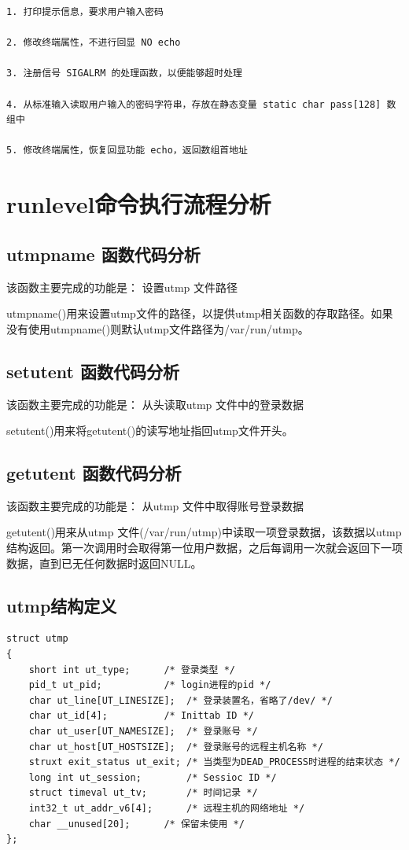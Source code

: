 {\begin{shaded}\begin{verbatim}
1. 打印提示信息，要求用户输入密码

2. 修改终端属性，不进行回显 NO echo

3. 注册信号 SIGALRM 的处理函数，以便能够超时处理

4. 从标准输入读取用户输入的密码字符串，存放在静态变量 static char pass[128] 数组中

5. 修改终端属性，恢复回显功能 echo，返回数组首地址
\end{verbatim}\end{shaded}}
\section{runlevel命令执行流程分析}

\subsection{utmpname 函数代码分析}

该函数主要完成的功能是： 设置utmp 文件路径

utmpname()用来设置utmp文件的路径，以提供utmp相关函数的存取路径。如果没有使用utmpname()则默认utmp文件路径为/var/run/utmp。

\subsection{setutent 函数代码分析}

该函数主要完成的功能是： 从头读取utmp 文件中的登录数据

setutent()用来将getutent()的读写地址指回utmp文件开头。

\subsection{getutent 函数代码分析}

该函数主要完成的功能是： 从utmp 文件中取得账号登录数据

getutent()用来从utmp 文件(/var/run/utmp)中读取一项登录数据，该数据以utmp
结构返回。第一次调用时会取得第一位用户数据，之后每调用一次就会返回下一项数据，直到已无任何数据时返回NULL。

\subsection{utmp结构定义}

{\begin{shaded}\begin{verbatim}
struct utmp
{
    short int ut_type;      /* 登录类型 */
    pid_t ut_pid;           /* login进程的pid */
    char ut_line[UT_LINESIZE];  /* 登录装置名，省略了/dev/ */
    char ut_id[4];          /* Inittab ID */
    char ut_user[UT_NAMESIZE];  /* 登录账号 */
    char ut_host[UT_HOSTSIZE];  /* 登录账号的远程主机名称 */
    struxt exit_status ut_exit; /* 当类型为DEAD_PROCESS时进程的结束状态 */
    long int ut_session;        /* Sessioc ID */
    struct timeval ut_tv;       /* 时间记录 */
    int32_t ut_addr_v6[4];      /* 远程主机的网络地址 */
    char __unused[20];      /* 保留未使用 */
};
\end{verbatim}\end{shaded}}

